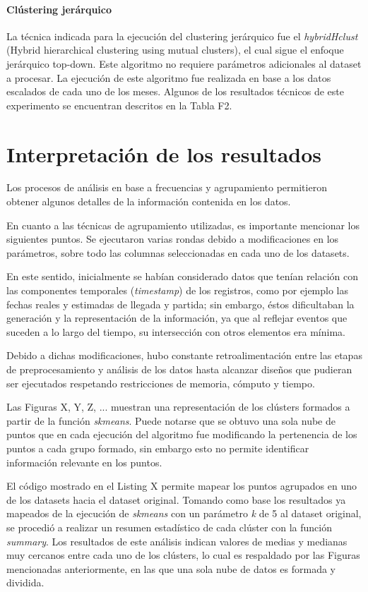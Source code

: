 \documentclass[12pt]{article}
\numberwithin{equation}{section}
\numberwithin{table}{section}
\numberwithin{figure}{section}
\begin{document}
\paragraph{Clústering jerárquico}
La técnica indicada para la ejecución del clustering jerárquico fue el \emph{hybridHclust} (Hybrid hierarchical clustering using mutual clusters), el cual sigue el enfoque jerárquico top-down. Este algoritmo no requiere parámetros adicionales al dataset a procesar.
La ejecución de este algoritmo fue realizada en base a los datos escalados de cada uno de los meses.
Algunos de los resultados técnicos de este experimento se encuentran descritos en la Tabla F2.

\section{Interpretación de los resultados}
Los procesos de análisis en base a frecuencias y agrupamiento permitieron obtener algunos detalles de la información contenida en los datos.

En cuanto a las técnicas de agrupamiento utilizadas, es importante mencionar los siguientes puntos.
Se ejecutaron varias rondas debido a modificaciones en los parámetros, sobre todo las columnas seleccionadas en cada uno de los datasets.

En este sentido, inicialmente se habían considerado datos que tenían relación con las componentes temporales (\emph{timestamp}) de los registros, como por ejemplo las fechas reales y estimadas de llegada y partida; sin embargo, éstos dificultaban la generación y la representación de la información, ya que al reflejar eventos que suceden a lo largo del tiempo, su intersección con otros elementos era mínima.

Debido a dichas modificaciones, hubo constante retroalimentación entre las etapas de preprocesamiento y análisis de los datos hasta alcanzar diseños que pudieran ser ejecutados respetando restricciones de memoria, cómputo y tiempo.

Las Figuras X, Y, Z, ... muestran una representación de los clústers formados a partir de la función \emph{skmeans}.
Puede notarse que se obtuvo una sola nube de puntos que en cada ejecución del algoritmo fue modificando la pertenencia de los puntos a cada grupo formado, sin embargo esto no permite identificar información relevante en los puntos.

El código mostrado en el Listing X permite mapear los puntos agrupados en uno de los datasets hacia el dataset original. 
Tomando como base los resultados ya mapeados de la ejecución de \emph{skmeans} con un parámetro \emph{k} de 5 al dataset original, se procedió a realizar un resumen estadístico de cada clúster con la función \emph{summary}.
Los resultados de este análisis indican valores de medias y medianas muy cercanos entre cada uno de los clústers, lo cual es respaldado por las Figuras mencionadas anteriormente, en las que una sola nube de datos es formada y dividida.
\end{document}
